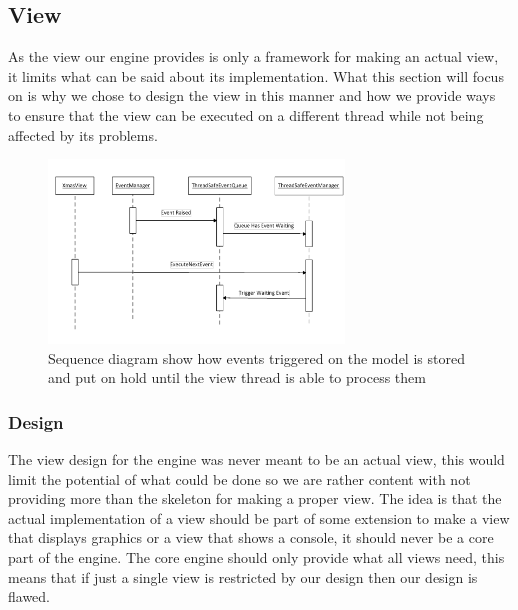 
\subsection{View}

As the view our engine provides is only a framework for making an
actual view, it limits what can be said about its implementation.
What this section will focus on is why we chose to design the view
in this manner and how we provide ways to ensure that the view can
be executed on a different thread while not being affected by its
problems.

\begin{figure}
\begin{centering}
\includegraphics[width=0.7\textwidth]{ViewImpThreadSafeSequenceDiagram}
\par\end{centering}

\caption{Sequence diagram show how events triggered on the model is stored
and put on hold until the view thread is able to process them\label{fig:ThreadSafeSequenceDiagram}}
\end{figure}



\subsubsection{Design}

The view design for the engine was never meant to be an actual view,
this would limit the potential of what could be done so we are rather
content with not providing more than the skeleton for making a proper
view. The idea is that the actual implementation of a view should
be part of some extension to make a view that displays graphics or
a view that shows a console, it should never be a core part of the
engine. The core engine should only provide what all views need, this
means that if just a single view is restricted by our design then
our design is flawed.


